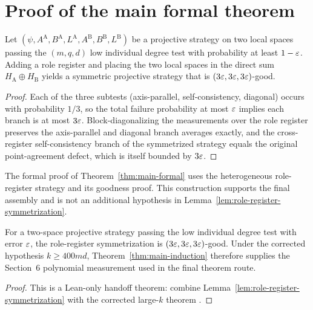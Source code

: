 \section{Proof of the main formal theorem}

\begin{lemma}\label{lem:role-register-symmetrization}
	\leanok
	Let $(\psi,A^{\mathrm A},B^{\mathrm A},L^{\mathrm A},A^{\mathrm B},B^{\mathrm B},L^{\mathrm B})$ be a projective strategy on two local spaces passing the $(m,q,d)$ low individual degree test with probability at least $1-\varepsilon$.  Adding a role register and placing the two local spaces in the direct sum \(H_{\mathrm A}\oplus H_{\mathrm B}\) yields a symmetric projective strategy that is $(3\varepsilon,3\varepsilon,3\varepsilon)$-good.
\end{lemma}
\begin{proof}
	\leanok
	Each of the three subtests (axis-parallel, self-consistency, diagonal) occurs with probability $1/3$, so the total failure probability at most $\varepsilon$ implies each branch is at most $3\varepsilon$. Block-diagonalizing the measurements over the role register preserves the axis-parallel and diagonal branch averages exactly, and the cross-register self-consistency branch of the symmetrized strategy equals the original point-agreement defect, which is itself bounded by $3\varepsilon$.
\end{proof}

\begin{remark}\label{rem:symmetrization-data}
	The formal proof of Theorem~\ref{thm:main-formal} uses the heterogeneous
	role-register strategy and its goodness proof.  This construction supports
	the final assembly and is not an additional hypothesis in
	Lemma~\ref{lem:role-register-symmetrization}.
\end{remark}

	\begin{proposition}\label{lem:main-formal-role-register-handoff}
		\leanok
		For a two-space projective strategy passing the low individual degree test
		with error $\varepsilon$, the role-register symmetrization is
		$(3\varepsilon,3\varepsilon,3\varepsilon)$-good.  Under the corrected hypothesis
		$k\ge400md$, Theorem~\ref{thm:main-induction} therefore supplies the
		Section~6 polynomial measurement used in the final theorem route.
	\end{proposition}
	\begin{proof}
		\leanok
		This is a Lean-only handoff theorem: combine
		Lemma~\ref{lem:role-register-symmetrization} with the corrected
		large-\(k\) theorem .
	\end{proof}

